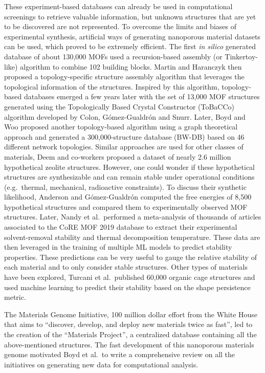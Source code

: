 \documentclass[main.tex]{subfiles}
\begin{document}
These experiment-based databases can already be used in computational screenings to retrieve valuable information, but unknown structures that are yet to be discovered are not represented. To overcome the limits and biases of experimental synthesis, artificial ways of generating nanoporous material datasets can be used, which proved to be extremely efficient. The first \emph{in silico} generated database of about 130,000 MOFs used a recursion-based assembly (or Tinkertoy-like) algorithm to combine 102 building blocks.\cite{Wilmer_2012} Martin and Haranczyk then proposed a topology-specific structure assembly algorithm that leverages the topological information of the structures.\cite{Martin_2014} Inspired by this algorithm, topology-based databases emerged a few years later with the set of 13,000 MOF structures generated using the Topologically Based Crystal Constructor (ToBaCCo) algorithm developed by Colon, G{\'{o}}mez-Gualdr{\'{o}}n and Snurr.\cite{Colon_2017} Later, Boyd and Woo proposed another topology-based algorithm using a graph theoretical approach and generated a 300,000-structure database (BW-DB) based on 46 different network topologies.\cite{Boyd_2016} Similar approaches are used for other classes of materials, Deem and co-workers proposed a dataset of nearly 2.6 million hypothetical zeolite structures.\cite{Earl_2006,Deem_2009,Pophale_2011} However, one could wonder if these hypothetical structures are synthesizable and can remain stable under operational conditions (e.g.\ thermal, mechanical, radioactive constraints). To discuss their synthetic likelihood, Anderson and G{\'{o}}mez-Gualdr{\'{o}}n computed the free energies of 8,500 hypothetical structures and compared them to experimentally observed MOF structures.\cite{Anderson_2020} Later, Nandy et al.\ performed a meta-analysis of thousands of articles associated to the CoRE MOF 2019 database to extract their experimental solvent-removal stability and thermal decomposition temperature.\cite{Nandy_2021} These data are then leveraged in the training of multiple ML models to predict stability properties. These predictions can be very useful to gauge the relative stability of each material and to only consider stable structures. Other types of materials have been explored, Turcani et al.\ published 60,000 organic cage structures and used machine learning to predict their stability based on the shape persistence metric.\cite{Turcani_2018}

The Materials Genome Initiative, 100 million dollar effort from the White House that aims to ``discover, develop, and deploy new materials twice as fast'', led to the creation of the ``Materials Project'', a centralized database containing all the above-mentioned structures.\cite{kalil2011national,Matgenome,Jain_2013}
The fast development of this nanoporous materials genome motivated Boyd et al.\ to write a comprehensive review on all the initiatives on generating new data for computational analysis.\cite{Boyd_2017}
\end{document}
